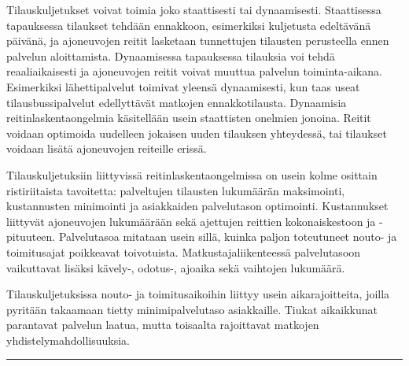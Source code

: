 \documentclass[a4paper,12pt]{article}
\newcommand*\sepline{%
  \begin{center}
    \rule[1ex]{.5\textwidth}{.5pt}
  \end{center}}
\begin{document}
Tilauskuljetukset voivat toimia joko staattisesti tai dynaamisesti. Staattisessa tapauksessa tilaukset tehdään ennakkoon, 
esimerkiksi kuljetusta edeltävänä päivänä, ja ajoneuvojen reitit lasketaan tunnettujen tilausten perusteella ennen palvelun aloittamista. 
Dynaamisessa tapauksessa tilauksia voi tehdä reaaliaikaisesti ja ajoneuvojen reitit voivat muuttua palvelun toiminta-aikana.
Esimerkiksi lähettipalvelut toimivat yleensä dynaamisesti, kun taas useat tilausbussipalvelut edellyttävät matkojen ennakkotilausta. %
Dynaamisia reitinlaskentaongelmia käsitellään usein staattisten onelmien jonoina. Reitit voidaan optimoida uudelleen jokaisen uuden 
tilauksen yhteydessä, tai tilaukset voidaan lisätä ajoneuvojen reiteille erissä. 

Tilauskuljetuksiin liittyvissä reitinlaskentaongelmissa on usein kolme osittain ristiriitaista tavoitetta:
palveltujen tilausten lukumäärän maksimointi, kustannusten minimointi ja asiakkaiden palvelutason optimointi.
Kustannukset liittyvät ajoneuvojen lukumäärään sekä ajettujen reittien kokonaiskestoon ja -pituuteen.
Palvelutasoa mitataan usein sillä, kuinka paljon toteutuneet nouto- ja toimitusajat poikkeavat toivotuista. 
Matkustajaliikenteessä palvelutasoon vaikuttavat lisäksi kävely-, odotus-, ajoaika sekä vaihtojen lukumäärä.

Tilauskuljetuksissa nouto- ja toimitusaikoihin liittyy usein aikarajoitteita, %
joilla pyritään takaamaan tietty minimipalvelutaso asiakkaille. Tiukat aikaikkunat parantavat palvelun laatua,
mutta toisaalta rajoittavat matkojen yhdistelymahdollisuuksia.

\sepline


\end{document}
